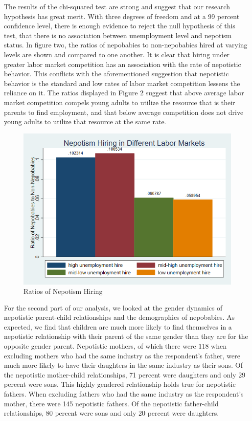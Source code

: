 \documentclass[12pt]{article}
\begin{document}
The results of the chi-squared test are strong and suggest that our research hypothesis has great merit. With three degrees of freedom and at a 99 percent confidence level, there is enough evidence to reject the null hypothesis of this test, that there is no association between unemployment level and nepotism status. In figure two, the ratios of nepobabies to non-nepobabies hired at varying levels are shown and compared to one another. It is clear that hiring under greater labor market competition has an association with the rate of nepotistic behavior. This conflicts with the aforementioned suggestion that nepotistic behavior is the standard and low rates of labor market competition lessens the reliance on it. The ratios displayed in Figure 2 suggest that above average labor market competition compels young adults to utilize the resource that is their parents to find employment, and that below average competition does not drive young adults to utilize that resource at the same rate.


\begin{figure}
    \centering
    \includegraphics[width=0.65\linewidth]{nepotismratios.png}
    \caption{Ratios of Nepotism Hiring}
    \label{fig:enter-label}
\end{figure}

For the second part of our analysis, we looked at the gender dynamics of nepotistic parent-child relationships and the demographics of nepobabies. As expected, we find that children are much more likely to find themselves in a nepotistic relationship with their parent of the same gender than they are for the opposite gender parent. Nepotistic mothers, of which there were 118 when excluding mothers who had the same industry as the respondent’s father, were much more likely to have their daughters in the same industry as their sons. Of the nepotistic mother-child relationships, 71 percent were daughters and only 29 percent were sons. This highly gendered relationship holds true for nepotistic fathers. When excluding fathers who had the same industry as the respondent’s mother, there were 145 nepotistic fathers. Of the nepotistic father-child relationships, 80 percent were sons and only 20 percent were daughters. 
\end{document}
